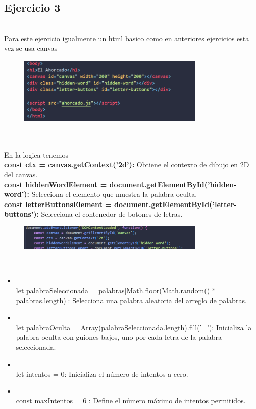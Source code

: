 \documentclass{article}
\begin{document}
\subsection{Ejercicio 3}
\\Para este ejercicio igualmente un html basico como en anteriores ejercicios esta vez se usa canvas
\begin{figure}[H]
		          \centering
		          \includegraphics[width=0.8\textwidth,keepaspectratio]                       {img/bodyAh.png}
    \end{figure}  
\\
\\En la logica tenemos 
\\\textbf{const ctx = canvas.getContext('2d'):} Obtiene el contexto de dibujo en 2D del canvas.
\\\textbf{const hiddenWordElement = document.getElementById('hidden-word'):} Selecciona el elemento que muestra la palabra oculta.
\\\textbf{const letterButtonsElement = document.getElementById('letter-buttons'):} Selecciona el contenedor de botones de letras.
\begin{figure}[H]
		          \centering
		          \includegraphics[width=0.8\textwidth,keepaspectratio]                       {img/DOMAh.png}
    \end{figure}  
\\
\begin{itemize}
    \item \\let palabraSeleccionada = palabras[Math.floor(Math.random() * palabras.length)]: Selecciona una palabra aleatoria del arreglo de palabras.
    \item \\let palabraOculta = Array(palabraSeleccionada.length).fill('_'): Inicializa la palabra oculta con guiones bajos, uno por cada letra de la palabra seleccionada.
    \item \\let intentos = 0: Inicializa el número de intentos a cero.
    \item \\const maxIntentos = 6 : Define el número máximo de intentos permitidos.
\end{itemize}
\end{document}
